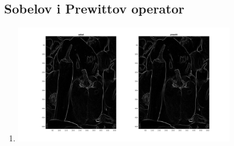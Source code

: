 \documentclass[12pt, a4]{report}
\begin{document}
\begin{enumerate}
\section{Sobelov i Prewittov operator}
\begin{enumerate}
    \item
        \begin{minipage}{\linewidth}
            \centering
            \includegraphics[width=0.75\textwidth]{edge}
        \end{minipage}
    

    
\end{enumerate}
\end{enumerate}
\end{document}
